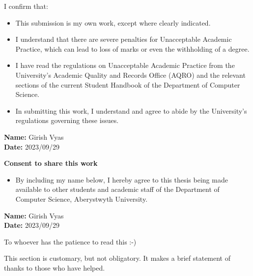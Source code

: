 \documentclass{main}
\begin{document}
\begin{singlespace}

  I confirm that:\\
  \begin{itemize}
    \item This submission is my own work, except where clearly indicated.
    \item I understand that there are severe penalties for Unacceptable Academic Practice, which can lead to loss of marks or even the withholding of a degree.
    \item I have read the regulations on Unacceptable Academic Practice from the University’s Academic Quality and Records Office (AQRO) and the relevant    sections of the current Student Handbook of the Department of Computer Science.
    \item In submitting this work, I understand and agree to abide by the University’s regulations governing these issues.
  \end{itemize}
  \vspace{10pt}
  \textbf{Name:} Girish Vyas\\
  \textbf{Date:} 2023/09/29
  \vspace{50pt}

  \begin{center}
    \textbf{Consent to share this work}
  \end{center}
  \begin{itemize}
    \item By including my name below, I hereby agree to this thesis being made available to other students and academic staff of the Department of Computer Science, Aberystwyth University.
  \end{itemize}

  \vspace{10pt}
  \textbf{Name:} Girish Vyas\\
  \textbf{Date:} 2023/09/29






  \null\vskip1.5in
  \begin{center}

    To whoever has the patience to read this :-)

    This section is customary, but not obligatory.  It makes a brief statement of thanks to those who have helped.

  \end{center}

  \afterpreface

\end{singlespace}
\end{document}
